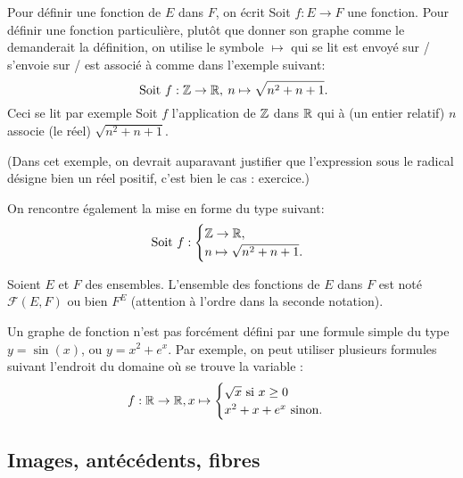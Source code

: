 Pour définir une fonction de $E$ dans $F$, on écrit \og Soit $f : E\to F$ une fonction\fg. Pour définir une fonction particulière, plutôt que donner son graphe comme le demanderait la définition, on utilise le symbole \og$\mapsto$\fg{} qui se lit \og est envoyé sur / s'envoie sur / est associé à \fg{} comme dans l'exemple suivant:
\[
\text{ Soit } f :\mathbb{Z} \to \mathbb{R},\: n\mapsto \sqrt{n^2+n+1}.
\]
Ceci se lit par exemple \og Soit $f$ l'application de $\mathbb{Z}$ dans $\mathbb{R}$ qui à (un entier relatif) $n$ associe (le réel) $\sqrt{n^2+n+1}$\fg.


(Dans cet exemple, on devrait auparavant justifier que l'expression sous le radical désigne bien un réel positif, c'est bien le cas : exercice.)

On rencontre également la mise en forme du type suivant:
\[
\text{ Soit } f :\begin{cases}\mathbb{Z} \to \mathbb{R},\\ n\mapsto \sqrt{n^2+n+1}.\end{cases}
\]
\begin{definition}
Soient $E$ et $F$ des ensembles. L'ensemble des fonctions de $E$ dans $F$ est noté $\mathcal F(E,F)$ ou bien $F^E$ (attention à l'ordre dans la seconde notation).
\end{definition}

\begin{remarque}
Un graphe de fonction n'est pas forcément défini par une formule simple du type $y=\sin(x)$, ou $y=x^2+e^x$. Par exemple, on peut utiliser plusieurs formules suivant l'endroit du domaine où se trouve la variable :
\[ f: 
\mathbb{R} \to \mathbb{R}, 
x\mapsto \begin{cases}\sqrt{x}\text{ si }x\geq 0\\ x^2+x+e^x\text{ sinon.}\end{cases}\]
\end{remarque}

\subsection{Images, antécédents, fibres}

